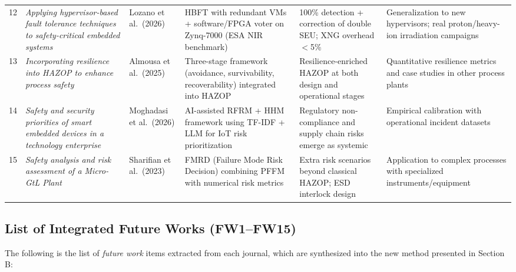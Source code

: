 \documentclass[11pt,a4paper]{article}
\begin{document}
\begin{longtable}{@{}p{0.4cm} p{3.2cm} p{2.4cm} p{3.2cm} p{2.8cm} p{2.6cm}@{}}
12 & \textit{Applying hypervisor-based fault tolerance techniques to safety-critical embedded systems} & Lozano et al.\ (2026) & HBFT with redundant VMs + software/FPGA voter on Zynq-7000 (ESA NIR benchmark) & 100\% detection + correction of double SEU; XNG overhead $<$5\% & Generalization to new hypervisors; real proton/heavy-ion irradiation campaigns\\

13 & \textit{Incorporating resilience into HAZOP to enhance process safety} & Almousa et al.\ (2025) & Three-stage framework (avoidance, survivability, recoverability) integrated into HAZOP & Resilience-enriched HAZOP at both design and operational stages & Quantitative resilience metrics and case studies in other process plants\\

14 & \textit{Safety and security priorities of smart embedded devices in a technology enterprise} & Moghadasi et al.\ (2026) & AI-assisted RFRM + HHM framework using TF-IDF + LLM for IoT risk prioritization & Regulatory non-compliance and supply chain risks emerge as systemic & Empirical calibration with operational incident datasets\\

15 & \textit{Safety analysis and risk assessment of a Micro-GtL Plant} & Sharifian et al.\ (2023) & FMRD (Failure Mode Risk Decision) combining PFFM with numerical risk metrics & Extra risk scenarios beyond classical HAZOP; ESD interlock design & Application to complex processes with specialized instruments/equipment\\

\end{longtable}

\subsection*{List of Integrated Future Works (FW1--FW15)}

The following is the list of \textit{future work} items extracted from each journal, which are synthesized into the new method presented in Section B:
\end{document}
